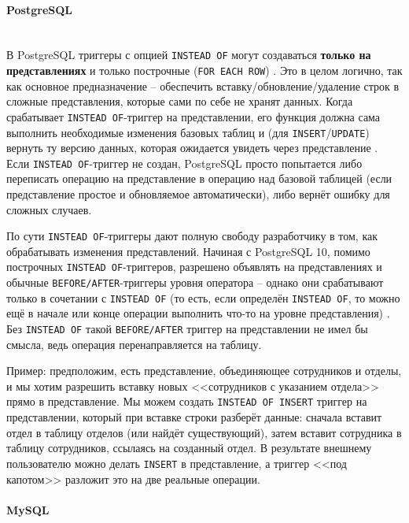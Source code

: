 \paragraph{\textbf{PostgreSQL}} ~\\

 В PostgreSQL триггеры с опцией \texttt{INSTEAD OF} могут создаваться \textbf{только на представлениях} и только построчные (\texttt{FOR EACH ROW}) \autocite{PostgreSQLdocc37}. Это в целом логично, так как основное предназначение – обеспечить вставку/обновление/удаление строк в сложные представления, которые сами по себе не хранят данных. Когда срабатывает \texttt{INSTEAD OF}-триггер на представлении, его функция должна сама выполнить необходимые изменения базовых таблиц и (для \texttt{INSERT}/\texttt{UPDATE}) вернуть ту версию данных, которая ожидается увидеть через представление \autocite{PostgreSQLdocc37}. Если \texttt{INSTEAD OF}-триггер не создан, PostgreSQL просто попытается либо переписать операцию на представление в операцию над базовой таблицей (если представление простое и обновляемое автоматически), либо вернёт ошибку для сложных случаев. 
 
 По сути \texttt{INSTEAD OF}-триггеры дают полную свободу разработчику в том, как обрабатывать изменения представлений. Начиная с PostgreSQL 10, помимо построчных \texttt{INSTEAD OF}-триггеров, разрешено объявлять на представлениях и обычные \texttt{BEFORE/AFTER}-триггеры уровня оператора – однако они срабатывают только в сочетании с \texttt{INSTEAD OF} (то есть, если определён \texttt{INSTEAD OF}, то можно ещё в начале или конце операции выполнить что-то на уровне представления) \autocite{PostgreSQLdocc37}. Без \texttt{INSTEAD OF} такой \texttt{BEFORE/AFTER} триггер на представлении не имел бы смысла, ведь операция перенаправляется на таблицу.

 Пример: предположим, есть представление, объединяющее сотрудников и отделы, и мы хотим разрешить вставку новых <<сотрудников с указанием отдела>> прямо в представление. Мы можем создать \texttt{INSTEAD OF INSERT} триггер на представлении, который при вставке строки разберёт данные: сначала вставит отдел в таблицу отделов (или найдёт существующий), затем вставит сотрудника в таблицу сотрудников, ссылаясь на созданный отдел. В результате внешнему пользователю можно делать \texttt{INSERT} в представление, а триггер <<под капотом>> разложит это на две реальные операции.

\paragraph{\textbf{MySQL}} ~\\

